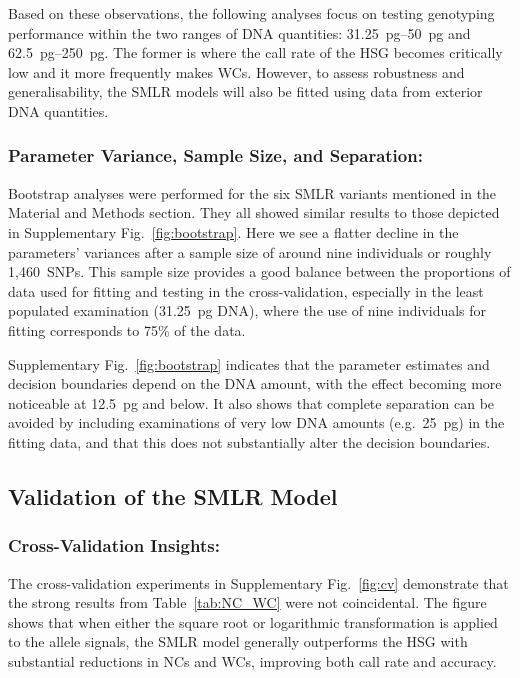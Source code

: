 \documentclass[preprint,5p,times,11pt]{elsarticle}
\begin{document}
Based on these observations, the following analyses focus on testing genotyping performance within the two ranges of DNA quantities: \SIrange[range-units = single, range-phrase = --]{31.25}{50}{\pg} and \SIrange[range-units = single, range-phrase = --]{62.5}{250}{\pg}.
The former is where the call rate of the HSG becomes critically low and it more frequently makes WCs.
However, to assess robustness and generalisability, the SMLR models will also be fitted using data from exterior DNA quantities.


\subsubsection*{Parameter Variance, Sample Size, and Separation:}
Bootstrap analyses were performed for the six SMLR variants mentioned in the Material and Methods section.
They all showed similar results to those depicted in Supplementary Fig.~\ref{fig:bootstrap}.
Here we see a flatter decline in the parameters’ variances after a sample size of around nine individuals or roughly 1,460~SNPs.
This sample size provides a good balance between the proportions of data used for fitting and testing in the cross-validation, especially in the least populated examination (\SI{31.25}{\pg} DNA), where the use of nine individuals for fitting corresponds to 75\% of the data.

Supplementary Fig.~\ref{fig:bootstrap} indicates that the parameter estimates and decision boundaries depend on the DNA amount, with the effect becoming more noticeable at \SI{12.5}{\pg} and below.
It also shows that complete separation can be avoided by including examinations of very low DNA amounts (e.g.~\SI{25}{\pg}) in the fitting data, and that this does not substantially alter the decision boundaries.


\subsection{Validation of the SMLR Model}
\subsubsection*{Cross-Validation Insights:}
The cross-validation experiments in Supplementary Fig.~\ref{fig:cv} demonstrate that the strong results from Table~\ref{tab:NC_WC} were not coincidental.
The figure shows that when either the square root or logarithmic transformation is applied to the allele signals, the SMLR model generally outperforms the HSG with substantial reductions in NCs and WCs, improving both call rate and accuracy.
\end{document}
